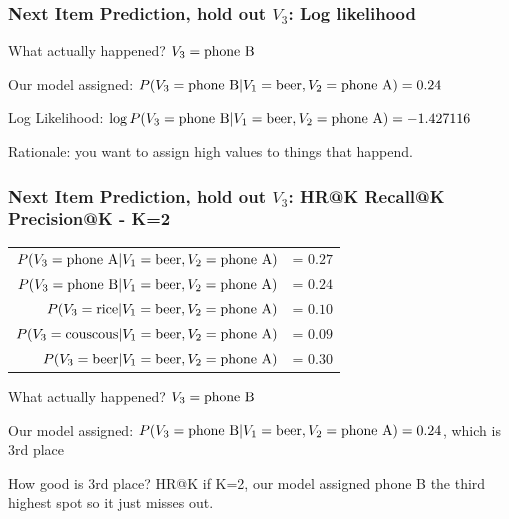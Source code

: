  \begin{frame}
  \frametitle{Next Item Prediction, hold out $V_3$: Log likelihood}

What actually happened? \pause $V_3 = {\rm phone ~ B} $

\vspace{4mm}  
  \pause
Our model assigned: $P(V_3 = {\rm phone ~ B} | V_1 = {\rm beer}, V_2 = {\rm phone ~ A}) = 0.24$ 

\vspace{4mm}  

\pause
Log Likelihood:
$\log P(V_3 = {\rm phone ~ B} | V_1 = {\rm beer}, V_2 = {\rm phone ~ A}) = -1.427116$ 

\vspace{4mm}  

\pause
Rationale:  you want to assign high values to things that happend.

 \end{frame}




 \begin{frame}
  \frametitle{Next Item Prediction, hold out $V_3$: HR@K Recall@K
    Precision@K - K=2}

  \begin{tabular}{r r}
    $P(V_3 = {\rm phone ~ A} | V_1 = {\rm beer}, V_2 = {\rm phone ~ A} )$ &= $0.27$ \\
    $P(V_3 = {\rm phone ~ B} | V_1 = {\rm beer}, V_2 = {\rm phone ~ A} )$ &= $0.24$ \\
    $P(V_3 = {\rm rice} | V_1 = {\rm beer}, V_2 = {\rm phone ~ A} )$ &= $0.10$ \\
    $P(V_3 = {\rm couscous} | V_1 = {\rm beer}, V_2 = {\rm phone ~ A} )$ &= $0.09$ \\
    $P(V_3 = {\rm beer} | V_1 = {\rm beer}, V_2 = {\rm phone ~ A} )$ &= $0.30$ \\
  \end{tabular}

  What actually happened? \pause $V_3 = {\rm phone ~ B} $


  \vspace{4mm}  
  \pause
Our model assigned: $P(V_3 = {\rm phone ~ B} | V_1 = {\rm beer}, V_2 = {\rm phone ~ A}) = 0.24$, which is 3rd place

How good is 3rd place?
\pause
HR@K if K=2, our model assigned phone B the third highest spot so it just misses out.

\vspace{4mm}  


 \end{frame}


